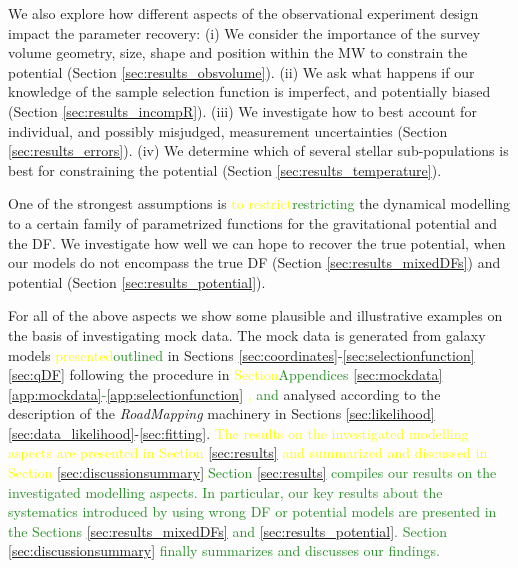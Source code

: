\documentclass[iop,revtex4,numberedappendix,appendixfloats]{emulateapj}
\newcommand{\RM}{{\sl RoadMapping}}
\newcommand{\NEW}[1]{\textcolor{ForestGreen}{#1}}
\newcommand{\OLD}[1]{\textcolor{Yellow}{#1}}%
\begin{document}
We also explore how different aspects of the observational experiment design impact the parameter recovery: (i) We consider the importance of the survey volume geometry, size, shape and position within the MW to constrain the potential (Section \ref{sec:results_obsvolume}). (ii) We ask what happens if our knowledge of the sample selection function is imperfect, and potentially biased (Section \ref{sec:results_incompR}). (iii) We investigate how to best account for individual, and possibly misjudged, measurement uncertainties (Section \ref{sec:results_errors}). (iv) We determine which of several stellar sub-populations is best for constraining the potential (Section \ref{sec:results_temperature}). 

One of the strongest assumptions is \OLD{to restrict}\NEW{restricting} the dynamical modelling to a certain family of parametrized functions for the gravitational potential and the DF. We investigate how well we can hope to recover the true potential, when our models do not encompass the true DF (Section \ref{sec:results_mixedDFs}) and potential (Section \ref{sec:results_potential}).

For all of the above aspects we show some plausible and illustrative examples on the basis of investigating mock data. The mock data is generated from galaxy models \OLD{presented}\NEW{outlined} in Sections \ref{sec:coordinates}-\OLD{\ref{sec:selectionfunction}}\NEW{\ref{sec:qDF}} following the procedure in \OLD{Section}\NEW{Appendices} \OLD{\ref{sec:mockdata}}\NEW{\ref{app:mockdata}-\ref{app:selectionfunction}} \OLD{, }\NEW{ and }analysed according to the description of the \RM{} machinery in Sections \OLD{\ref{sec:likelihood}}\NEW{\ref{sec:data_likelihood}}-\ref{sec:fitting}. \OLD{The results on the investigated modelling aspects are presented in Section \ref{sec:results} and summarized and discussed in Section \ref{sec:discussionsummary}.}\NEW{Section \ref{sec:results} compiles our results on the investigated modelling aspects. In particular, our key results about the systematics introduced by using wrong DF or potential models are presented in the Sections \ref{sec:results_mixedDFs} and \ref{sec:results_potential}. Section \ref{sec:discussionsummary} finally summarizes and discusses our findings.}


\end{document}
